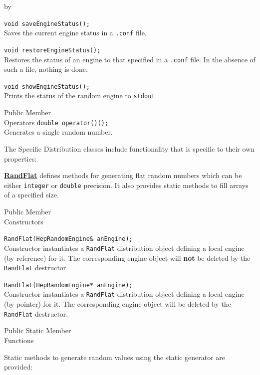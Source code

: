 \documentclass[twoside]{article}
\newcommand{\comp}[1]{\texttt{#1}}%
\newcommand{\entrylabel}[1]{\mbox{\textbf{{#1}}}\hfil}%
\newenvironment{entry}
{\begin{list}{}%
    {\renewcommand{\makelabel}{\entrylabel}%
     \setlength{\labelwidth}{90pt}%
     \setlength{\leftmargin}{\labelwidth}
     \advance\leftmargin by \labelsep%
      }%
    }%
  {\end{list}}
\newcommand{\Entrylabel}[1]%
{\raisebox{0pt}[1ex][0pt]{\makebox[\labelwidth][l]%
    {\parbox[t]{\labelwidth}{\hspace{0pt}\textbf{{#1}}}}}}
\newenvironment{Entry}%
{\renewcommand{\entrylabel}{\Entrylabel}\begin{entry}}%
  {\end{entry}}
\begin{document}
\begin{description}
\begin{Entry}
    \verb+void saveEngineStatus();+\\
    Saves the current engine status in a \comp{.conf} file.
    
    \verb+void restoreEngineStatus();+\\
    Restores the status of an engine to that specified in
    a \comp{.conf} file.  In the absence of such a file,
    nothing is done.

    \verb+void showEngineStatus();+\\
    Prints the status of the random engine to \comp{stdout}.
        
\item[Public Member\\ Operators]
    \verb+double operator()();+\\
    Generates a single random number.
  
    The Specific Distribution classes include functionality that is specific
    to their own properties:
    
    \begin{description}
      \item \underline{\bf RandFlat}  defines methods for generating flat random numbers
        which can be either \comp{integer} or \comp{double} precision.
        It also provides static methods to fill arrays of a specified size.
    \end{description}
    
\item[Public Member\\ Constructors]
  
    \verb+RandFlat(HepRandomEngine& anEngine);+\\
    Constructor instantiates a \comp{RandFlat} distribution
    object defining a local engine (by reference) for it.  The
    corresponding engine object will {\bf not} be deleted by the
    \comp{RandFlat} destructor.
     
    \verb+RandFlat(HepRandomEngine* anEngine);+\\
    Constructor instantiates a \comp{RandFlat} distribution
    object defining a local engine (by pointer) for it.
    The corresponding engine object will be deleted by the
    \comp{RandFlat} destructor.

\item[Public Static Member\\ Functions]
  
    Static methods to generate random values using the static generator
    are provided:


\end{Entry}
\end{description}
\end{document}
